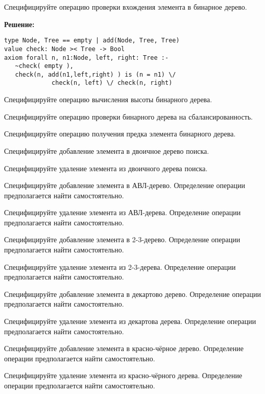 

%
%


\z Специфицируйте операцию проверки вхождения элемента в бинарное дерево.

\textbf{Решение:}
\begin{lstlisting}
type Node, Tree == empty | add(Node, Tree, Tree)
value check: Node >< Tree -> Bool
axiom forall n, n1:Node, left, right: Tree :-
   ~check( empty ),
   check(n, add(n1,left,right) ) is (n = n1) \/
             check(n, left) \/ check(n, right)
\end{lstlisting}

\z Специфицируйте операцию вычисления высоты бинарного дерева.

\z Специфицируйте операцию проверки бинарного дерева на сбалансированность.

\z Специфицируйте операцию получения предка элемента бинарного дерева.

\z Специфицируйте добавление элемента в двоичное дерево поиска.

\z Специфицируйте удаление элемента из двоичного дерева поиска.

\z Специфицируйте добавление элемента в АВЛ-дерево. Определение операции предполагается найти самостоятельно.

\z Специфицируйте удаление элемента из АВЛ-дерева. Определение операции предполагается найти самостоятельно.

\z Специфицируйте добавление элемента в 2-3-дерево. Определение операции предполагается найти самостоятельно.

\z Специфицируйте удаление элемента из 2-3-дерева. Определение операции предполагается найти самостоятельно.

\z Специфицируйте добавление элемента в декартово дерево. Определение операции предполагается найти самостоятельно.

\z Специфицируйте удаление элемента из декартова дерева. Определение операции предполагается найти самостоятельно.

\z Специфицируйте добавление элемента в красно-чёрное дерево.  Определение операции предполагается найти самостоятельно.

\z Специфицируйте удаление элемента из красно-чёрного дерева.  Определение операции предполагается найти самостоятельно.

